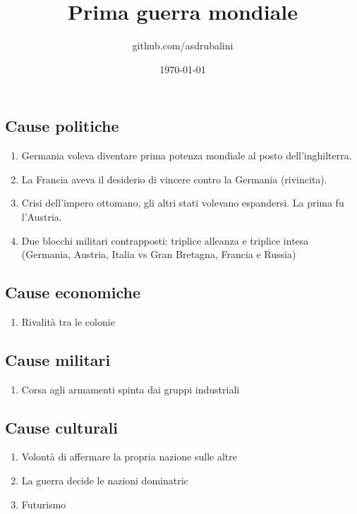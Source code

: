 \documentclass{article}
\title{Prima guerra mondiale}
\author{github.com/asdrubalini}
\date{\today}
\begin{document}
    \maketitle

    \subsection{Cause politiche}
    \begin{enumerate}
        \item Germania voleva diventare prima potenza mondiale al posto dell'inghilterra.
        \item La Francia aveva il desiderio di vincere contro la Germania (rivincita).
        \item Crisi dell'impero ottomano, gli altri stati volevano espandersi. La prima fu l'Austria.
        \item Due blocchi militari contrapposti: triplice alleanza e triplice intesa (Germania, Austria, Italia vs Gran Bretagna, Francia e Russia)
    \end{enumerate}

    \subsection{Cause economiche}
    \begin{enumerate}
        \item Rivalità tra le colonie
    \end{enumerate}

    \subsection{Cause militari}
    \begin{enumerate}
        \item Corsa agli armamenti spinta dai gruppi industriali
    \end{enumerate}

    \subsection{Cause culturali}
    \begin{enumerate}
        \item Volontà di affermare la propria nazione sulle altre
        \item La guerra decide le nazioni dominatric
        \item Futurismo
    \end{enumerate}
\end{document}

